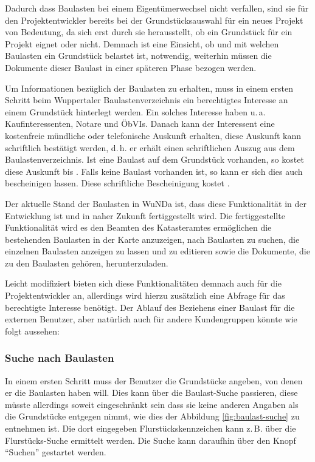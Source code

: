 Dadurch dass Baulasten bei einem Eigentümerwechsel nicht verfallen, sind sie für den Projektentwickler bereits bei der Grundstücksauswahl für ein neues Projekt von Bedeutung, da sich erst durch sie herausstellt, ob ein Grundstück für ein Projekt eignet oder nicht. 
Demnach ist eine Einsicht, ob und mit welchen Baulasten ein Grundstück belastet ist, notwendig, weiterhin müssen die Dokumente dieser Baulast in einer späteren Phase bezogen werden.

Um Informationen bezüglich der Baulasten zu erhalten, muss in einem ersten Schritt beim  Wuppertaler Baulastenverzeichnis ein berechtigtes Interesse an einem Grundstück hinterlegt werden.
Ein solches Interesse haben u.\,a. Kaufinteressenten, Notare und \acp{ÖbVI}.
Danach kann der Interessent eine kostenfreie mündliche oder telefonische Auskunft erhalten, diese Auskunft kann schriftlich bestätigt werden, d.\,h. er erhält einen schriftlichen Auszug  aus dem Baulastenverzeichnis.
Ist eine Baulast auf dem Grundstück vorhanden, so kostet diese Auskunft  bis .
Falls keine Baulast vorhanden ist, so kann er sich dies auch bescheinigen lassen. Diese schriftliche Bescheinigung kostet  \autocite[vgl.][]{wupp-baulast}.

Der aktuelle Stand der Baulasten in \ac{WuNDa} ist, dass diese Funktionalität in der Entwicklung ist und in naher Zukunft fertiggestellt wird.
Die fertiggestellte Funktionalität wird es den Beamten des Katasteramtes ermöglichen die bestehenden Baulasten in der Karte anzuzeigen, nach Baulasten zu suchen, die einzelnen Baulasten anzeigen zu lassen und zu editieren sowie die Dokumente, die zu den Baulasten gehören, herunterzuladen.

Leicht modifiziert bieten sich diese Funktionalitäten demnach auch für die Projektentwickler an, allerdings wird hierzu zusätzlich eine Abfrage für das berechtigte Interesse benötigt.
Der Ablauf des Beziehens einer Baulast für die externen Benutzer, aber natürlich auch für andere Kundengruppen könnte wie folgt aussehen:
\subsubsection{Suche nach Baulasten}
In einem ersten Schritt muss der Benutzer die Grundstücke angeben, von denen er die Baulasten haben will.
Dies kann über die Baulast-Suche passieren, diese müsste allerdings soweit eingeschränkt sein dass sie keine anderen Angaben als die Grundstücke entgegen nimmt, wie dies der Abbildung \ref{fig:baulast-suche} zu entnehmen ist.
Die dort eingegeben Flurstückskennzeichen kann z.\,B. über die Flurstücks-Suche ermittelt werden. Die Suche kann daraufhin über den Knopf \enquote{Suchen} gestartet werden.


